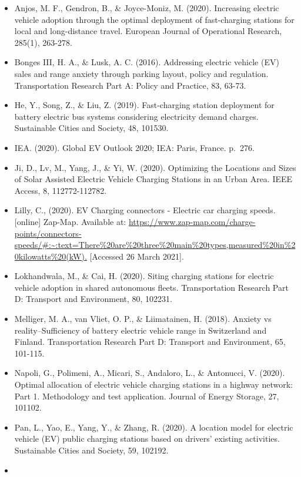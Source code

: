\documentclass[
]{book}
\providecommand{\tightlist}{%
  \setlength{\itemsep}{0pt}\setlength{\parskip}{0pt}}
\begin{document}
\begin{itemize}
\tightlist
\item
  Anjos, M. F., Gendron, B., \& Joyce-Moniz, M. (2020). Increasing electric vehicle adoption through the optimal deployment of fast-charging stations for local and long-distance travel. European Journal of Operational Research, 285(1), 263-278.
\item
  Bonges III, H. A., \& Lusk, A. C. (2016). Addressing electric vehicle (EV) sales and range anxiety through parking layout, policy and regulation. Transportation Research Part A: Policy and Practice, 83, 63-73.
\item
  He, Y., Song, Z., \& Liu, Z. (2019). Fast-charging station deployment for battery electric bus systems considering electricity demand charges. Sustainable Cities and Society, 48, 101530.
\item
  IEA. (2020). Global EV Outlook 2020; IEA: Paris, France. p.~276.
\item
  Ji, D., Lv, M., Yang, J., \& Yi, W. (2020). Optimizing the Locations and Sizes of Solar Assisted Electric Vehicle Charging Stations in an Urban Area. IEEE Access, 8, 112772-112782.
\item
  Lilly, C., (2020). EV Charging connectors - Electric car charging speeds. {[}online{]} Zap-Map. Available at: \url{https://www.zap-map.com/charge-points/connectors-speeds/\#:~:text=There\%20are\%20three\%20main\%20types,measured\%20in\%20kilowatts\%20(kW).} {[}Accessed 26 March 2021{]}.
\item
  Lokhandwala, M., \& Cai, H. (2020). Siting charging stations for electric vehicle adoption in shared autonomous fleets. Transportation Research Part D: Transport and Environment, 80, 102231.
\item
  Melliger, M. A., van Vliet, O. P., \& Liimatainen, H. (2018). Anxiety vs reality--Sufficiency of battery electric vehicle range in Switzerland and Finland. Transportation Research Part D: Transport and Environment, 65, 101-115.
\item
  Napoli, G., Polimeni, A., Micari, S., Andaloro, L., \& Antonucci, V. (2020). Optimal allocation of electric vehicle charging stations in a highway network: Part 1. Methodology and test application. Journal of Energy Storage, 27, 101102.
\item
  Pan, L., Yao, E., Yang, Y., \& Zhang, R. (2020). A location model for electric vehicle (EV) public charging stations based on drivers' existing activities. Sustainable Cities and Society, 59, 102192.
\item

\end{itemize}
\end{document}
